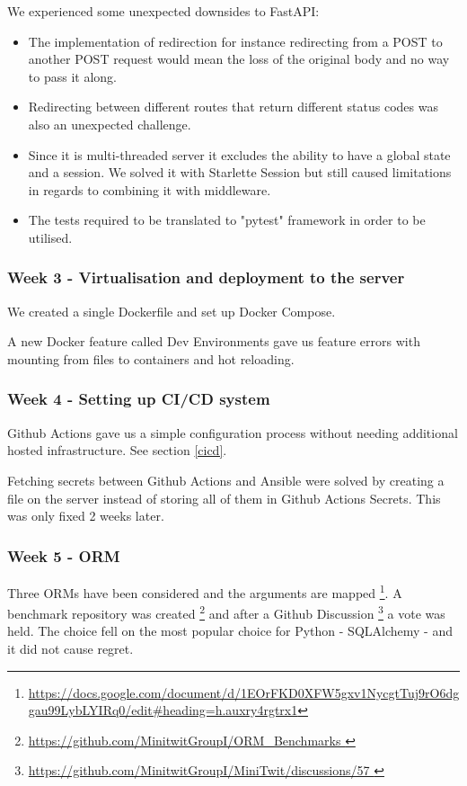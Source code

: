 \documentclass{article}
\begin{document}
We experienced some unexpected downsides to FastAPI:
\begin{itemize}
    \item The implementation of redirection for instance redirecting from a POST to another POST request would mean the loss of the original body and no way to pass it along. 
    \item Redirecting between different routes that return different status codes was also an unexpected challenge. 
    \item Since it is multi-threaded server it excludes the ability to have a global state and a session. We solved it with Starlette Session but still caused limitations in regards to combining it with middleware.
    \item The tests required to be translated to "pytest" framework in order to be utilised.
\end{itemize}

\subsubsection{Week 3 - Virtualisation and deployment to the server}

We created a single Dockerfile and set up Docker Compose. 

A new Docker feature called Dev Environments gave us feature errors with mounting from files to containers and hot reloading.

\subsubsection{Week 4 - Setting up CI/CD system }

Github Actions gave us a simple configuration process without needing additional hosted infrastructure. See section \ref{cicd}. 

Fetching secrets between Github Actions and Ansible were solved by creating a file on the server instead of storing all of them in Github Actions Secrets. This was only fixed 2 weeks later.

\subsubsection{Week 5 - ORM }

Three ORMs have been considered and the arguments are mapped \footnote{\url{https://docs.google.com/document/d/1EOrFKD0XFW5gxv1NycgtTuj9rO6dggau99LybLYIRq0/edit\#heading=h.auxry4rgtrx1}}. A benchmark repository was created \footnote{\url{https://github.com/MinitwitGroupI/ORM_Benchmarks }} and after a Github Discussion \footnote{\url{https://github.com/MinitwitGroupI/MiniTwit/discussions/57 }} a vote was held. The choice fell on the most popular choice for Python - SQLAlchemy - and it did not cause regret. 
\end{document}
